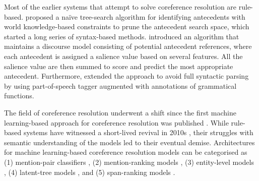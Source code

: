 \documentclass[11pt]{article}
\begin{document}
Most of the earlier systems that attempt to solve coreference resolution are rule-based. \textcite{hobbs1978} proposed a naïve tree-search algorithm for identifying antecedents with world knowledge-based constraints to prune the antecedent search space, which started a long series of syntax-based methods. \textcite{lappin1994} introduced an algorithm that maintains a discourse model consisting of potential antecedent references, where each antecedent is assigned a salience value based on several features. All the salience value are then summed to score and predict the most appropriate antecedent. Furthermore, \textcite{kennedy1996} extended the approach to avoid full syntactic parsing by using part-of-speech tagger augmented with annotations of grammatical functions.

The field of coreference resolution underwent a shift since the first machine learning-based approach for coreference resolution was published \parencite{ConnollyEtAl:94}. While rule-based systems have witnessed a short-lived revival in 2010s \parencite{zhou2004, haghighi2009}, their struggles with semantic understanding of the models led to their eventual demise. Architectures for machine learning-based coreference resolution models can be categorised as (1) mention-pair classifiers \parencite{ng2002identifying,bengtson2008understanding}, (2) mention-ranking models \parencite{durrett2013easy,wiseman2015learning,clark2016deep,denis-baldridge-2008-specialized}, (3) entity-level models \parencite{haghighi-klein-2010-coreference,wiseman-etal-2016-learning,clark-manning-2015-entity,clark-manning-2016-improving}, (4) latent-tree models \parencite{fernandes-etal-2012-latent,martschat-strube-2015-latent,bjorkelund-kuhn-2014-learning}, and (5) span-ranking models \parencite{lee2017end,lee2018higher,joshi2019coref}.

\end{document}
